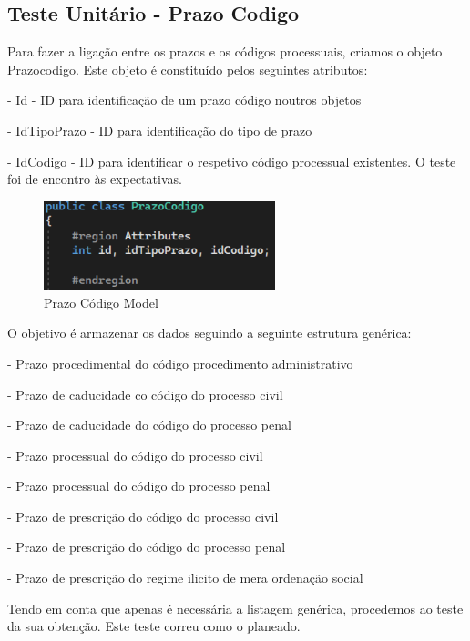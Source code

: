\newpage


\subsection{Teste Unitário - Prazo Codigo}
\indent \par Para fazer a ligação entre os prazos e os códigos processuais, criamos o objeto Prazocodigo.
Este objeto é constituído pelos seguintes atributos:
\indent \par - Id - ID para identificação de um prazo código noutros objetos
\indent \par - IdTipoPrazo - ID para identificação do tipo de prazo
\indent \par - IdCodigo - ID para identificar o respetivo código processual existentes. O teste foi de encontro às expectativas.

\begin{figure}[!h]
\centering
\includegraphics[width=0.6\textwidth]{Figuras/Models/PrazoCodigoModel.png}
\caption{Prazo Código Model}
\label{d.model}
\end{figure}

\indent \par O objetivo é armazenar os dados seguindo a seguinte estrutura genérica:
\indent \par - Prazo procedimental do código procedimento administrativo
\indent \par - Prazo de caducidade co código do processo civil
\indent \par - Prazo de caducidade do código do processo penal
\indent \par - Prazo processual do código do processo civil
\indent \par - Prazo processual do código do processo penal
\indent \par - Prazo de prescrição do código do processo civil
\indent \par - Prazo de prescrição do código do processo penal
\indent \par - Prazo de prescrição do regime ilicito de mera ordenação social

\indent \par Tendo em conta que apenas é necessária a listagem genérica, procedemos ao teste da sua obtenção. Este teste correu como o planeado.

